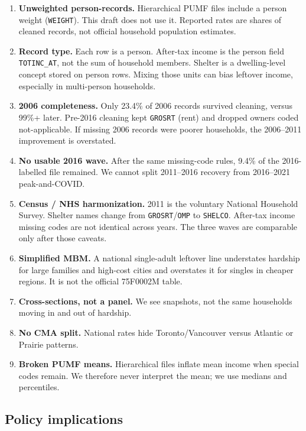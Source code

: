 \documentclass[11pt,letterpaper]{article}
\begin{document}
\begin{enumerate}[leftmargin=1.6em]
  \item \textbf{Unweighted person-records.} Hierarchical PUMF files include a person weight (\texttt{WEIGHT}). This draft does not use it. Reported rates are shares of cleaned records, not official household population estimates.
  \item \textbf{Record type.} Each row is a person. After-tax income is the person field \texttt{TOTINC\_AT}, not the sum of household members. Shelter is a dwelling-level concept stored on person rows. Mixing those units can bias leftover income, especially in multi-person households.
  \item \textbf{2006 completeness.} Only 23.4\% of 2006 records survived cleaning, versus 99\%+ later. Pre-2016 cleaning kept \texttt{GROSRT} (rent) and dropped owners coded not-applicable. If missing 2006 records were poorer households, the 2006--2011 improvement is overstated.
  \item \textbf{No usable 2016 wave.} After the same missing-code rules, 9.4\% of the 2016-labelled file remained. We cannot split 2011--2016 recovery from 2016--2021 peak-and-COVID.
  \item \textbf{Census / NHS harmonization.} 2011 is the voluntary National Household Survey. Shelter names change from \texttt{GROSRT}/\texttt{OMP} to \texttt{SHELCO}. After-tax income missing codes are not identical across years. The three waves are comparable only after those caveats.
  \item \textbf{Simplified MBM.} A national single-adult leftover line understates hardship for large families and high-cost cities and overstates it for singles in cheaper regions. It is not the official 75F0002M table.
  \item \textbf{Cross-sections, not a panel.} We see snapshots, not the same households moving in and out of hardship.
  \item \textbf{No CMA split.} National rates hide Toronto/Vancouver versus Atlantic or Prairie patterns.
  \item \textbf{Broken PUMF means.} Hierarchical files inflate mean income when special codes remain. We therefore never interpret the mean; we use medians and percentiles.
\end{enumerate}

\subsection{Policy implications}
\label{sec:policy}
\end{document}
